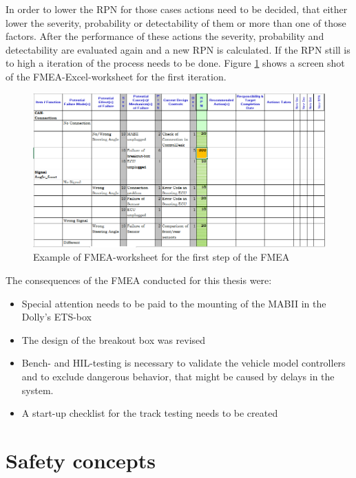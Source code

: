\documentclass[ExampleMasters.tex]{subfiles}
\begin{document}
In order to lower the RPN for those cases actions need to be decided, that either lower the severity, probability or detectability of them or more than one of those factors. After the performance of these actions the severity, probability and detectability are evaluated again and a new RPN is calculated. If the RPN still is to high a iteration of the process needs to be done. \cite{din_60812_fmea}
Figure \ref{fig:fmea_example} shows a screen shot of the FMEA-Excel-worksheet for the first iteration.    
\begin{figure}[h]
	\centering
	\includegraphics[width=1.0\linewidth]{figures/fmea_example}
	\caption[]{Example of FMEA-worksheet for the first step of the FMEA}
	\label{fig:fmea_example}
\end{figure}
The consequences of the FMEA conducted for this thesis were:
\begin{itemize}
	\item Special attention needs to be paid to the mounting of the MABII in the Dolly's ETS-box
	\item The design of the breakout box was revised
	\item Bench- and HIL-testing is necessary to validate  the vehicle model controllers and to exclude dangerous behavior, that might be caused by delays in the system. 
	\item A start-up checklist for the track testing needs to be created	 
\end{itemize}  
\section{Safety concepts}
\label{sec:safetyconcepts}
\end{document}
